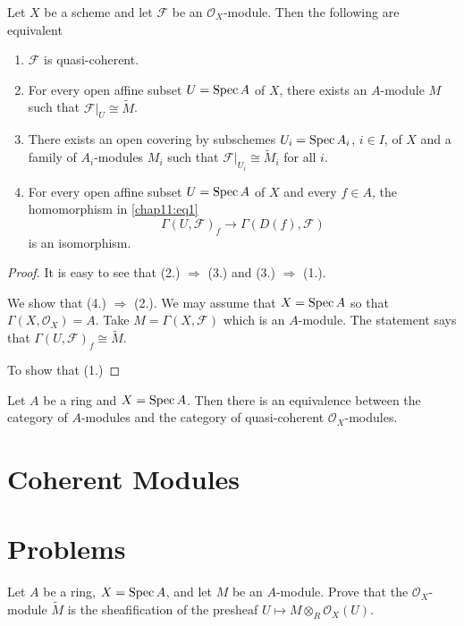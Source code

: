 \begin{theorem}
	Let $X$ be a scheme and let $\mathcal{F}$ be an $\mathcal{O}_X$-module. Then the following are equivalent
	\begin{enumerate}
		\item $\mathcal{F}$ is quasi-coherent.
		
		\item For every open affine subset $U = \operatorname{Spec} A$ of $X$, there exists an $A$-module $M$ such that $\mathcal{F}|_{U} \cong \tilde{M}$.
		
		\item There exists an open covering by subschemes $U_i = \operatorname{Spec} A_i$, $i \in I$, of $X$ and a family of $A_i$-modules $M_i$ such that $\mathcal{F}|_{U_i} \cong \tilde{M}_i$ for all $i$.
		
		\item For every open affine subset $U = \operatorname{Spec} A$ of $X$ and every $f \in A$, the homomorphism in \cref{chap11:eq1}
		\begin{equation*}
			\Gamma(U, \mathcal{F})_f \to \Gamma(D(f), \mathcal{F})
		\end{equation*}
		is an isomorphism.
	\end{enumerate}
\end{theorem}


\begin{proof}
	It is easy to see that (2.) $\Rightarrow$ (3.) and (3.) $\Rightarrow$ (1.).
	
	We show that (4.) $\Rightarrow$ (2.). We may assume that $X = \operatorname{Spec} A$ so that $\Gamma(X, \mathcal{O}_X) = A$. Take $M = \Gamma(X, \mathcal{F})$ which is an $A$-module. The statement says that $\Gamma(U, \mathcal{F})_f \cong \tilde{M} $. 
	
	To show that (1.) 
\end{proof}


\begin{corollary}
	Let $A$ be a ring and $X = \operatorname{Spec} A$. Then there is an equivalence between the category of $A$-modules and the category of quasi-coherent $\mathcal{O}_X$-modules.
\end{corollary}

\section{Coherent Modules}

\section{Problems}

\begin{problems}
	\item Let $A$ be a ring, $X = \operatorname{Spec} A$, and let $M$ be an $A$-module. Prove that the $\mathcal{O}_X$-module $\tilde{M}$ is the sheafification of the presheaf $U \mapsto M \otimes_R \mathcal{O}_X(U)$.
\end{problems}

